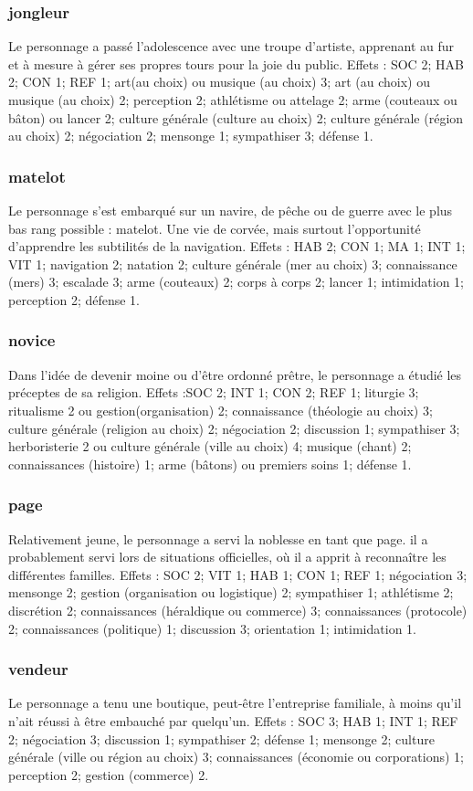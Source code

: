 \documentclass[10pt,a4paper,twocolumn]{book}
\begin{document}
\subsubsection{jongleur}
Le personnage a passé l’adolescence avec une troupe d’artiste, apprenant au fur et à mesure à gérer ses propres tours pour la joie du public.
Effets : SOC 2; HAB 2; CON 1; REF 1; art(au choix) ou musique (au choix) 3; art (au choix) ou musique (au choix) 2; perception 2; athlétisme ou attelage 2; arme (couteaux ou bâton) ou lancer 2; culture générale (culture au choix) 2; culture générale (région au choix) 2; négociation 2; mensonge 1; sympathiser 3; défense 1.
\subsubsection{matelot}
Le personnage s’est embarqué sur un navire, de pêche ou de guerre avec le plus bas rang possible : matelot. Une vie de corvée, mais surtout l’opportunité d’apprendre les subtilités de la navigation.
Effets : HAB 2; CON 1; MA 1; INT 1; VIT 1; navigation 2; natation 2; culture générale (mer au choix) 3; connaissance (mers) 3; escalade 3; arme (couteaux) 2; corps à corps 2; lancer 1; intimidation 1; perception 2; défense 1.
\subsubsection{novice}
Dans l’idée de devenir moine ou d’être ordonné prêtre, le personnage a étudié les préceptes de sa religion.
Effets :SOC 2; INT 1; CON 2; REF 1; liturgie 3; ritualisme 2 ou gestion(organisation) 2; connaissance (théologie au choix) 3; culture générale (religion au choix) 2; négociation 2; discussion 1; sympathiser 3; herboristerie 2 ou culture générale (ville au choix) 4; musique (chant) 2; connaissances (histoire) 1; arme (bâtons) ou premiers soins 1; défense 1. 
\subsubsection{page}
Relativement jeune, le personnage a servi la noblesse en tant que page. il a probablement servi lors de situations officielles, où il a apprit à reconnaître les différentes familles.
Effets : SOC 2; VIT 1; HAB 1; CON 1; REF 1; négociation 3; mensonge 2; gestion (organisation ou logistique) 2; sympathiser 1; athlétisme 2; discrétion 2; connaissances (héraldique ou commerce) 3; connaissances (protocole) 2; connaissances (politique) 1; discussion 3; orientation 1; intimidation 1.
\subsubsection{vendeur}
Le personnage a tenu une boutique, peut-être l’entreprise familiale, à moins qu’il n’ait réussi à être embauché par quelqu’un.
Effets : SOC 3; HAB 1; INT 1; REF 2; négociation  3; discussion 1; sympathiser 2; défense 1; mensonge 2; culture générale (ville ou région au choix) 3; connaissances (économie ou corporations) 1; perception  2; gestion (commerce) 2.
\end{document}
